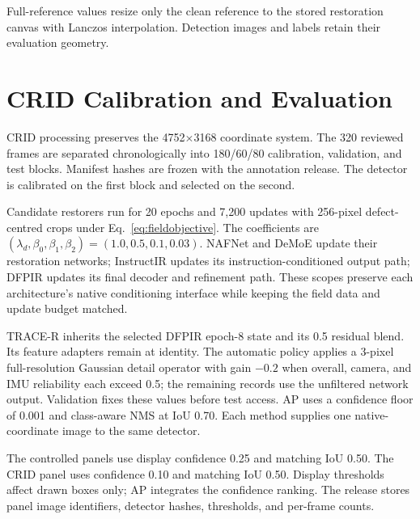\documentclass[journal]{IEEEtran}
\begin{document}




Full-reference values resize only the clean reference to the stored restoration canvas with Lanczos interpolation. Detection images and labels retain their evaluation geometry.

\section{CRID Calibration and Evaluation}
\label{sup:crid}
CRID processing preserves the 4752$\times$3168 coordinate system. The 320 reviewed frames are separated chronologically into 180/60/80 calibration, validation, and test blocks. Manifest hashes are frozen with the annotation release. The detector is calibrated on the first block and selected on the second.

Candidate restorers run for 20 epochs and 7,200 updates with 256-pixel defect-centred crops under Eq.~\eqref{eq:fieldobjective}. The coefficients are $(\lambda_d,\beta_0,\beta_1,\beta_2)=(1.0,0.5,0.1,0.03)$. NAFNet and DeMoE update their restoration networks; InstructIR updates its instruction-conditioned output path; DFPIR updates its final decoder and refinement path. These scopes preserve each architecture's native conditioning interface while keeping the field data and update budget matched.



TRACE-R inherits the selected DFPIR epoch-8 state and its 0.5 residual blend. Its feature adapters remain at identity. The automatic policy applies a 3-pixel full-resolution Gaussian detail operator with gain $-0.2$ when overall, camera, and IMU reliability each exceed 0.5; the remaining records use the unfiltered network output. Validation fixes these values before test access. AP uses a confidence floor of 0.001 and class-aware NMS at IoU 0.70. Each method supplies one native-coordinate image to the same detector.

The controlled panels use display confidence 0.25 and matching IoU 0.50. The CRID panel uses confidence 0.10 and matching IoU 0.50. Display thresholds affect drawn boxes only; AP integrates the confidence ranking. The release stores panel image identifiers, detector hashes, thresholds, and per-frame counts.
\end{document}
